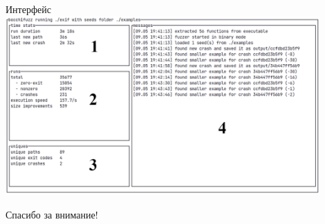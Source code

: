 \documentclass[hyperref={unicode=true}, 12pt]{beamer}
\begin{document}
	\begin{frame}[t]{Интерфейс}
		\includegraphics[width=12cm]{tui.png}
	\end{frame}

	\begin{frame}[c]
		\fontsize{26}{24}\selectfont
		\centering Спасибо за внимание!
	\end{frame}
	
\end{document}
